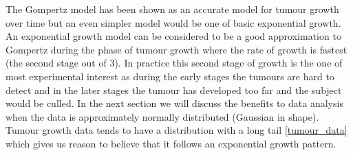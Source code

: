 The Gompertz model \autocite{Norton1976} has been shown as an accurate model for tumour growth over time but an even simpler model would be one of basic exponential growth.
An exponential growth model can be considered to be a good approximation to Gompertz during the phase of tumour growth where the rate of growth is fastest (the second stage out of 3).
In practice this second stage of growth is the one of most experimental interest as during the early stages the tumours are hard to detect and in the later stages the tumour has developed too far and the subject would be culled.
In the next section we will discuss the benefits to data analysis when the data is approximately normally distributed (Gaussian in shape).
Tumour growth data tends to have a distribution with a long tail \cref{tumour_data} which gives us reason to believe that it follows an exponential growth pattern.

